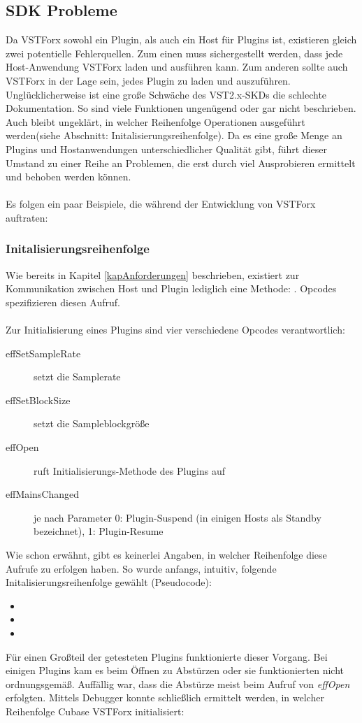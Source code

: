 \subsection{SDK Probleme}
Da VSTForx sowohl ein Plugin, als auch ein Host für Plugins ist, existieren gleich zwei potentielle Fehlerquellen. Zum einen muss sichergestellt werden, dass jede Host-Anwendung VSTForx laden und ausführen kann. Zum anderen sollte auch VSTForx in der Lage sein, jedes Plugin zu laden und auszuführen. Unglücklicherweise ist eine große Schwäche des VST2.x-SKDs die schlechte Dokumentation. So sind viele Funktionen ungenügend oder gar nicht beschrieben. Auch bleibt ungeklärt, in welcher Reihenfolge Operationen ausgeführt werden(siehe Abschnitt: Initalisierungsreihenfolge). Da es eine große Menge an Plugins und Hostanwendungen unterschiedlicher Qualität gibt, führt dieser Umstand zu einer Reihe an Problemen, die erst durch viel Ausprobieren ermittelt und behoben werden können. 
\\\\
Es folgen ein paar Beispiele, die während der Entwicklung von VSTForx auftraten:
\subsubsection{Initalisierungsreihenfolge}
Wie bereits in Kapitel \ref{kapAnforderungen} beschrieben, existiert zur Kommunikation zwischen Host und Plugin lediglich eine Methode: . Opcodes spezifizieren diesen Aufruf.
\\\\
Zur Initialisierung eines Plugins sind vier verschiedene Opcodes verantwortlich:

\begin{description}
	\item[effSetSampleRate] setzt die Samplerate
	\item[effSetBlockSize] setzt die Sampleblockgröße
	\item[effOpen] ruft Initialisierungs-Methode des Plugins auf
	\item[effMainsChanged] je nach Parameter 0: Plugin-Suspend (in einigen Hosts als Standby bezeichnet), 1: Plugin-Resume
\end{description}

Wie schon erwähnt, gibt es keinerlei Angaben, in welcher Reihenfolge diese Aufrufe zu erfolgen haben. So wurde anfangs, intuitiv, folgende Initalisierungsreihenfolge gewählt (Pseudocode):

\begin{itemize}
	\item {}
	\item {}
	\item {}
\end{itemize}
\NP
Für einen Großteil der getesteten Plugins funktionierte dieser Vorgang. Bei einigen Plugins kam es beim Öffnen zu Abstürzen oder sie funktionierten nicht ordnungsgemäß. Auffällig war, dass die Abstürze meist beim Aufruf von \emph{effOpen} erfolgten. Mittels Debugger konnte schließlich ermittelt werden, in welcher Reihenfolge Cubase VSTForx initialisiert:
 

